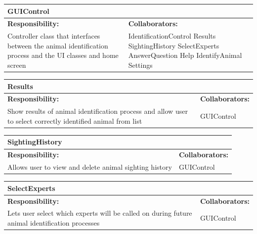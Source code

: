 \documentclass[]{article}
\begin{document}
\begin{table}[H]
	\centering
	\begin{tabular}{|p{5cm}|p{5cm}|}
		\hline
		\multicolumn{2}{|l|}{\textbf{GUIControl}} \\
		\hline
		\textbf{Responsibility:} & \textbf{Collaborators:} \\
		\hline
		 Controller class that interfaces  between the animal identification process and the UI classes and home screen & IdentificationControl \break Results \break SightingHistory \break SelectExperts \break AnswerQuestion \break Help \break IdentifyAnimal \break Settings\\
\hline
	\end{tabular}
\end{table}
\begin{table}[H]
	\centering
	\begin{tabular}{|p{5cm}|p{5cm}|}
		\hline
		\multicolumn{2}{|l|}{\textbf{Results}} \\
		\hline
		\textbf{Responsibility:} & \textbf{Collaborators:} \\
		\hline
		Show results of animal identification process and allow user to select correctly identified animal from list & GUIControl\\
		\hline

	\end{tabular}
\end{table}
\begin{table}[H]
	\centering
	\begin{tabular}{|p{5cm}|p{5cm}|}
		\hline
		\multicolumn{2}{|l|}{\textbf{SightingHistory}} \\
		\hline
		\textbf{Responsibility:} & \textbf{Collaborators:} \\
		\hline
		 Allows user to view and delete animal sighting history & GUIControl \\
\hline
	\end{tabular}
\end{table}
\begin{table}[H]
	\centering
	\begin{tabular}{|p{5cm}|p{5cm}|}
		\hline
		\multicolumn{2}{|l|}{\textbf{SelectExperts}} \\
		\hline
		\textbf{Responsibility:} & \textbf{Collaborators:} \\
		\hline
		 Lets user select which experts will be called on during future animal identification processes & GUIControl \\
\hline
	\end{tabular}
\end{table}
\end{document}
